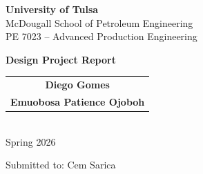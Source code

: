 
\begin{titlepage}
    \centering
    \vspace*{2cm}

    {\large\textbf{University of Tulsa}\\[0.3cm]}
    {\large McDougall School of Petroleum Engineering\\[0.3cm]}
    {\large PE 7023 -- Advanced Production Engineering\\[2cm]}

    {\Huge\bfseries Design Project Report\\[2.5cm]}

    \begin{tabular}{c}
        \textbf{Diego Gomes} \\
        \textbf{Emuobosa Patience Ojoboh} \\
    \end{tabular}\\[2cm]

    {\large Spring 2026}

    \vfill

    {\normalsize Submitted to: Cem Sarica\\}
\end{titlepage}